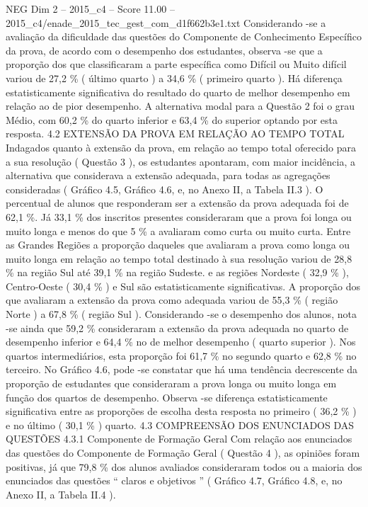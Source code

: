 \begin{textsample}{NEG Dim 2 – 2015\_c4 – Score 11.00 – 2015\_c4/enade\_2015\_tec\_gest\_com\_d1f662b3e1.txt}
Considerando -se a avaliação da dificuldade das questões do Componente de Conhecimento Específico da prova, de acordo com o desempenho dos estudantes, observa -se que a proporção dos que classificaram a parte específica como Difícil ou Muito difícil variou de 27,2 \% ( último quarto ) a 34,6 \% ( primeiro quarto ).
Há diferença estatisticamente significativa do resultado do quarto de melhor desempenho em relação ao de pior desempenho.
A alternativa modal para a Questão 2 foi o grau Médio, com 60,2 \% do quarto inferior e 63,4 \% do superior optando por esta resposta. 4.2 EXTENSÃO DA PROVA EM RELAÇÃO AO TEMPO TOTAL Indagados quanto à extensão da prova, em relação ao tempo total oferecido para a sua resolução ( Questão 3 ), os estudantes apontaram, com maior incidência, a alternativa que considerava a extensão adequada, para todas as agregações consideradas ( Gráfico 4.5, Gráfico 4.6, e, no Anexo II, a Tabela II.3 ).
O percentual de alunos que responderam ser a extensão da prova adequada foi de 62,1 \%.
Já 33,1 \% dos inscritos presentes consideraram que a prova foi longa ou muito longa e menos do que 5 \% a avaliaram como curta ou muito curta.
Entre as Grandes Regiões a proporção daqueles que avaliaram a prova como longa ou muito longa em relação ao tempo total destinado à sua resolução variou de 28,8 \% na região Sul até 39,1 \% na região Sudeste. e as regiões Nordeste ( 32,9 \% ), Centro-Oeste ( 30,4 \% ) e Sul são estatisticamente significativas.
A proporção dos que avaliaram a extensão da prova como adequada variou de 55,3 \% ( região Norte ) a 67,8 \% ( região Sul ).
Considerando -se o desempenho dos alunos, nota -se ainda que 59,2 \% consideraram a extensão da prova adequada no quarto de desempenho inferior e 64,4 \% no de melhor desempenho ( quarto superior ).
Nos quartos intermediários, esta proporção foi 61,7 \% no segundo quarto e 62,8 \% no terceiro.
No Gráfico 4.6, pode -se constatar que há uma tendência decrescente da proporção de estudantes que consideraram a prova longa ou muito longa em função dos quartos de desempenho.
Observa -se diferença estatisticamente significativa entre as proporções de escolha desta resposta no primeiro ( 36,2 \% ) e no último ( 30,1 \% ) quarto. 4.3 COMPREENSÃO DOS ENUNCIADOS DAS QUESTÕES 4.3.1 Componente de Formação Geral Com relação aos enunciados das questões do Componente de Formação Geral ( Questão 4 ), as opiniões foram positivas, já que 79,8 \% dos alunos avaliados consideraram todos ou a maioria dos enunciados das questões “ claros e objetivos ” ( Gráfico 4.7, Gráfico 4.8, e, no Anexo II, a Tabela II.4 ).

\end{textsample}
